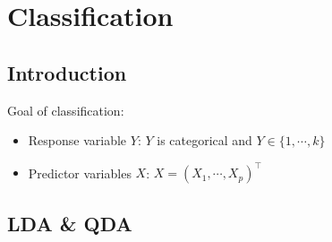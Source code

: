 \documentclass[a4paper]{article}
\begin{document}
\section{Classification}

\subsection{Introduction}

Goal of classification:
\begin{itemize}
    \item Response variable $Y$: $Y$ is categorical and $Y\in\{1,\cdots,k\}$
    \item Predictor variables $X$: $X=(X_1,\cdots,X_p)^{\intercal}$
\end{itemize}

\subsection{LDA \& QDA}
\end{document}
